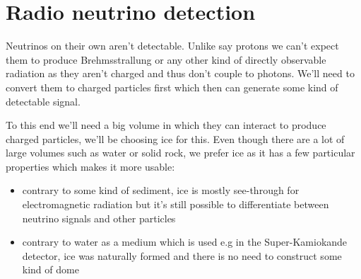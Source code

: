 \chapter{Radio neutrino detection}
Neutrinos on their own aren't detectable. Unlike say protons we can't expect
them to produce Brehmsstrallung or any other kind of directly observable
radiation as they aren't charged and thus don't couple to photons. We'll need
to convert them to charged particles first which then can generate some kind of
detectable signal.  

To this end we'll need a big volume in which they can interact to produce
charged particles, we'll be choosing ice for this.  Even though there are a lot
of large volumes such as water or solid rock, we prefer ice as it has a few particular properties
which makes it more usable:
\begin{itemize}
  \item contrary to some kind of sediment, ice is mostly see-through for electromagnetic radiation but it's still possible
    to differentiate between neutrino signals and other particles
  \item contrary to water as a medium which is used e.g in the Super-Kamiokande detector\cite{SuperKamio}, ice
    was naturally formed and there is no need to construct some kind of dome
\end{itemize}
